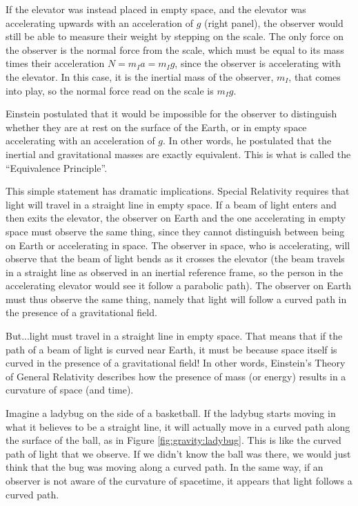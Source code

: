 If the elevator was instead placed in empty space, and the elevator was accelerating upwards with an acceleration of $g$ (right panel), the observer would still be able to measure their weight by stepping on the scale. The only force on the observer is the normal force from the scale, which must be equal to its mass times their acceleration $N=m_Ia=m_Ig$, since the observer is accelerating with the elevator. In this case, it is the inertial mass of the observer, $m_I$, that comes into play, so the normal force read on the scale is $m_Ig$.  


Einstein postulated that it would be impossible for the observer to distinguish whether they are at rest on the surface of the Earth, or in empty space accelerating with an acceleration of $g$. In other words, he postulated that the inertial and gravitational masses are exactly equivalent. This is what is called the ``Equivalence Principle''.

This simple statement has dramatic implications. Special Relativity requires that light will travel in a straight line in empty space. If a beam of light enters and then exits the elevator, the observer on Earth and the one accelerating in empty space must observe the same thing, since they cannot distinguish between being on Earth or accelerating in space. The observer in space, who is accelerating, will observe that the beam of light bends as it crosses the elevator (the beam travels in a straight line as observed in an inertial reference frame, so the person in the accelerating elevator would see it follow a parabolic path). The observer on Earth must thus observe the same thing, namely that light will follow a curved path in the presence of a gravitational field.

But...light must travel in a straight line in empty space. That means that if the path of a beam of light is curved near Earth, it must be because space itself is curved in the presence of a gravitational field! In other words, Einstein's Theory of General Relativity describes how the presence of mass (or energy) results in a curvature of space (and time).

Imagine a ladybug on the side of a basketball. If the ladybug starts moving in what it believes to be a straight line, it will actually move in a curved path along the surface of the ball, as in Figure \ref{fig:gravity:ladybug}. This is like the curved path of light that we observe. If we didn't know the ball was there, we would just think that the bug was moving along a curved path. In the same way, if an observer is not aware of the curvature of spacetime, it appears that light follows a curved path. 

